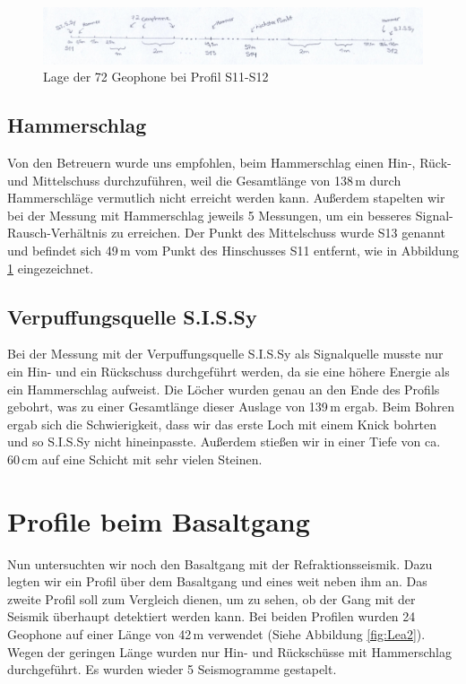 \begin{figure}[!ht]
 \centering
 \includegraphics[width=\textwidth]{fig/Skizze1}
 \caption{Lage der 72 Geophone bei Profil S11-S12}
 \label{fig:Lea1}
\end{figure}

\subsection{Hammerschlag}

Von den Betreuern wurde uns empfohlen, beim Hammerschlag einen Hin-, Rück- und Mittelschuss durchzuführen, weil die Gesamtlänge von 138\,m durch Hammerschläge vermutlich nicht erreicht werden kann. Außerdem stapelten wir bei der Messung mit Hammerschlag jeweils 5 Messungen, um ein besseres Signal-Rausch-Verhältnis zu erreichen. Der Punkt des Mittelschuss wurde S13 genannt und befindet sich 49\,m vom Punkt des Hinschusses S11 entfernt, wie in Abbildung \ref{fig:Lea1} eingezeichnet.

\subsection{Verpuffungsquelle S.I.S.Sy}

Bei der Messung mit der Verpuffungsquelle S.I.S.Sy als  Signalquelle musste nur ein Hin- und ein Rückschuss durchgeführt werden, da sie eine höhere Energie als ein Hammerschlag aufweist. Die Löcher wurden genau an den Ende des Profils gebohrt, was zu einer Gesamtlänge dieser Auslage von 139\,m ergab. Beim Bohren ergab sich die Schwierigkeit, dass wir das erste Loch mit einem Knick bohrten und so S.I.S.Sy nicht hineinpasste. Außerdem stießen wir in einer Tiefe von ca. 60\,cm auf eine Schicht mit sehr vielen Steinen.

\section{Profile beim Basaltgang}

Nun untersuchten wir noch den Basaltgang mit der Refraktionsseismik. Dazu legten wir ein Profil über dem Basaltgang und eines weit neben ihm an. Das zweite Profil soll zum Vergleich dienen, um zu sehen, ob der Gang mit der Seismik überhaupt detektiert werden kann. Bei beiden Profilen wurden 24 Geophone auf einer Länge von 42\,m verwendet (Siehe Abbildung \ref{fig:Lea2}). Wegen der geringen Länge wurden nur Hin- und Rückschüsse mit Hammerschlag durchgeführt. Es wurden wieder 5 Seismogramme gestapelt.

